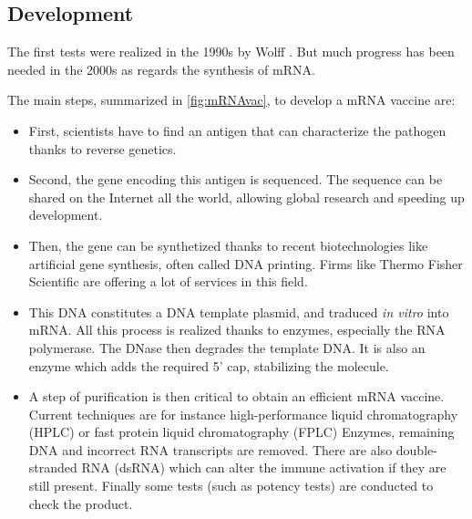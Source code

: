 \documentclass{article}
\begin{document}
        \subsection{Development}

            The first tests were realized in the 1990s by Wolff \autocite{wolffDirectGeneTransfer1990}.
            But much progress has been needed in the 2000s as regards the synthesis of mRNA.

            The main steps, summarized in \ref{fig:mRNAvac}, to develop a mRNA vaccine are:
            \begin{itemize}
                \item First, scientists have to find an antigen that can characterize the pathogen thanks to reverse genetics.
                \item Second, the gene encoding this antigen is sequenced. 
                    The sequence can be shared on the Internet all the world, allowing global research and speeding up development.
                \item Then, the gene can be synthetized thanks to recent biotechnologies like artificial gene synthesis, often called DNA printing. 
                    Firms like Thermo Fisher Scientific are offering a lot of services in this field.
                \item This DNA constitutes a DNA template plasmid, and traduced \emph{in vitro} into mRNA.
                        All this process is realized thanks to enzymes, especially the RNA polymerase. The DNase then degrades the template DNA.
                        It is also an enzyme which adds the required 5' cap, stabilizing the molecule.
                \item A step of purification is then critical to obtain an efficient mRNA vaccine. 
                        Current techniques are for instance high-performance liquid chromatography (HPLC) or fast protein liquid chromatography (FPLC)
                        Enzymes, remaining DNA and incorrect RNA transcripts are removed.
                        There are also double-stranded RNA (dsRNA) which can alter the immune activation if they are still present.
                        Finally some tests (such as potency tests) are conducted to check the product.
            \end{itemize} %
\end{document}
